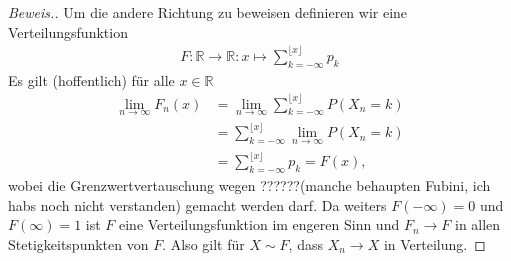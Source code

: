 \begin{proof}[Beweis.]
    Um die andere Richtung zu beweisen definieren wir eine Verteilungsfunktion
    \begin{align*}
        F:\mathbb{R}\to\mathbb{R}:x\mapsto\sum_{k=-\infty}^{\lfloor x\rfloor}p_k
    \end{align*}
    Es gilt (hoffentlich) für alle $x\in\mathbb{R}$
    \begin{align*}
        \lim_{n\to\infty}F_n(x)&=\lim_{n\to\infty}\sum_{k=-\infty}^{\lfloor x\rfloor}P(X_n=k)\\
        &=\sum_{k=-\infty}^{\lfloor x\rfloor}\lim_{n\to\infty}P(X_n=k)\\
        &=\sum_{k=-\infty}^{\lfloor x\rfloor}p_k=F(x),
    \end{align*}
    wobei die Grenzwertvertauschung wegen ??????(manche behaupten Fubini, ich habs noch nicht verstanden) gemacht werden darf. Da weiters $F(-\infty)=0$ und $F(\infty)=1$ ist $F$ eine Verteilungsfunktion im engeren Sinn und $F_n\to F$ in allen Stetigkeitspunkten von $F$. Also gilt für $X\sim F$, dass $X_n\to X$ in Verteilung.
\end{proof}